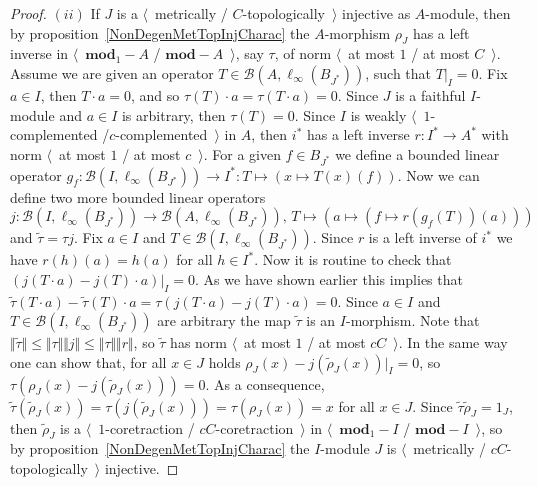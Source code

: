 \begin{proof}
$(ii)$ If $J$ is a $\langle$~metrically / $C$-topologically~$\rangle$ injective as
$A$-module, then by proposition~\ref{NonDegenMetTopInjCharac} the $A$-morphism
$\rho_J$ has a left inverse in $\langle$~$\mathbf{mod}_1-A$ /
$\mathbf{mod}-A$~$\rangle$, say $\tau $, of norm $\langle$~at most $1$ / at most
$C$~$\rangle$. Assume we are given an operator $T\in
\mathcal{B}(A,\ell_\infty(B_{J^*}))$, such that $T|_I=0$. Fix $a\in I$, then
$T\cdot a=0$, and so $\tau (T)\cdot a=\tau (T\cdot a)=0$. Since $J$ is a faithful
$I$-module and $a\in I$ is arbitrary, then $\tau (T)=0$. Since $I$ is weakly 
$\langle$~$1$-complemented /$c$-complemented~$\rangle$ in $A$, then $i^*$ has a left 
inverse $r:I^*\to A^*$ with norm $\langle$~at most $1$ / at most $c$~$\rangle$.
For a given $f\in B_{J^*}$ we define a bounded linear operator 
$g_f:\mathcal{B}(I,\ell_\infty(B_{J^*}))\to I^*:T\mapsto(x\mapsto T(x)(f))$. 
Now we can define two more bounded linear operators
$$
j:
\mathcal{B}(I,\ell_\infty(B_{J^*}))\to \mathcal{B}(A,\ell_\infty(B_{J^*})),\,
T\mapsto (a\mapsto (f\mapsto r(g_{f}(T))(a)))
$$ 
and $\widetilde{\tau}=\tau  j$. Fix $a\in I$ 
and $T\in\mathcal{B}(I,\ell_\infty(B_{J^*}))$. Since $r$ is a left inverse 
of $i^*$ we have $r(h)(a)=h(a)$ for all $h\in I^*$. Now it is routine to check 
that $(j(T\cdot a)-j(T)\cdot a)|_I=0$. As we have shown earlier this implies
that $\widetilde{\tau}(T\cdot a)-\widetilde{\tau}(T)\cdot a
=\tau (j(T\cdot a)-j(T)\cdot a)=0$. Since $a\in I$ 
and $T\in\mathcal{B}(I,\ell_\infty(B_{J^*}))$ are arbitrary the 
map $\widetilde{\tau}$ is an $I$-morphism.
Note that 
$\Vert\widetilde{\tau}\Vert\leq\Vert\tau \Vert\Vert j\Vert\leq \Vert
\tau\Vert\Vert r\Vert$, so $\widetilde{\tau}$ has 
norm $\langle$~at most $1$ / at most $cC$~$\rangle$.
In the same way one can show that, for all $x\in J$ 
holds $\rho_J(x)-j(\widetilde{\rho}_J(x))|_I=0$,
so $\tau (\rho_J(x)-j(\widetilde{\rho}_J(x)))=0$. As a consequence,
$\widetilde{\tau}(\widetilde{\rho}_J(x))
=\tau (j(\widetilde{\rho}_J(x)))=\tau(\rho_J(x))=x$ 
for all $x\in J$. Since $\widetilde{\tau}\widetilde{\rho}_J=1_J$,
then $\widetilde{\rho}_J$ is a  $\langle$~$1$-coretraction /
$cC$-coretraction~$\rangle$ in $\langle$~$\mathbf{mod}_1-I$ /
$\mathbf{mod}-I$~$\rangle$, so by proposition~\ref{NonDegenMetTopInjCharac} the
$I$-module $J$ is $\langle$~metrically / $cC$-topologically~$\rangle$ injective.
\end{proof}


